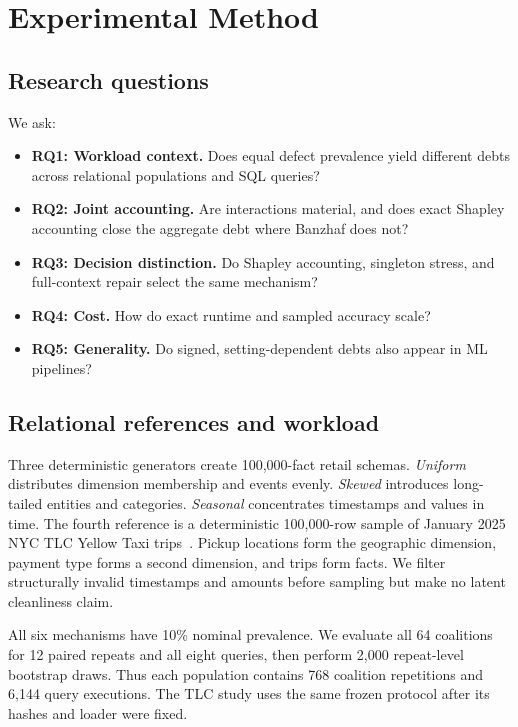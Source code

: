 \documentclass[conference]{IEEEtran}
\begin{document}
\section{Experimental Method}

\subsection{Research questions}

We ask:

\begin{itemize}
  \item \textbf{RQ1: Workload context.} Does equal defect prevalence yield different debts across relational populations and SQL queries?
  \item \textbf{RQ2: Joint accounting.} Are interactions material, and does exact Shapley accounting close the aggregate debt where Banzhaf does not?
  \item \textbf{RQ3: Decision distinction.} Do Shapley accounting, singleton stress, and full-context repair select the same mechanism?
  \item \textbf{RQ4: Cost.} How do exact runtime and sampled accuracy scale?
  \item \textbf{RQ5: Generality.} Do signed, setting-dependent debts also appear in ML pipelines?
\end{itemize}

\subsection{Relational references and workload}

Three deterministic generators create 100,000-fact retail schemas. \emph{Uniform} distributes dimension membership and events evenly. \emph{Skewed} introduces long-tailed entities and categories. \emph{Seasonal} concentrates timestamps and values in time. The fourth reference is a deterministic 100,000-row sample of January 2025 NYC TLC Yellow Taxi trips~\cite{nyctlc2025}. Pickup locations form the geographic dimension, payment type forms a second dimension, and trips form facts. We filter structurally invalid timestamps and amounts before sampling but make no latent cleanliness claim.

All six mechanisms have 10\% nominal prevalence. We evaluate all 64 coalitions for 12 paired repeats and all eight queries, then perform 2,000 repeat-level bootstrap draws. Thus each population contains 768 coalition repetitions and 6,144 query executions. The TLC study uses the same frozen protocol after its hashes and loader were fixed.
\end{document}
